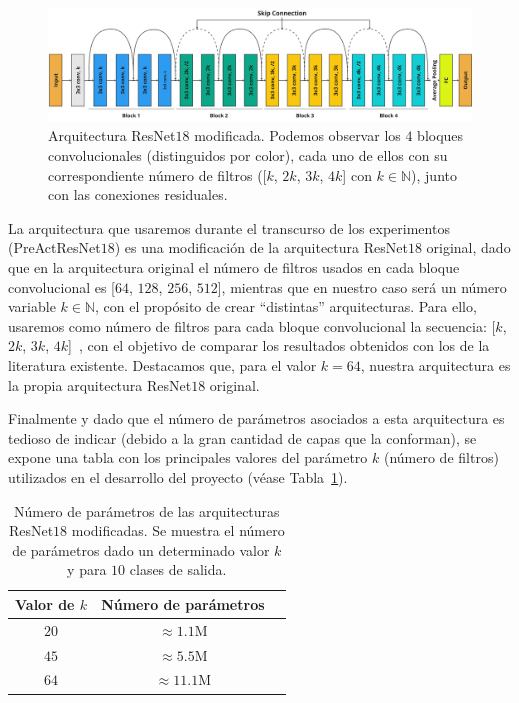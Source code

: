 \begin{figure}[h]
    \centering
    \includegraphics[width=\linewidth]{img/experiments/resnet18modified.png}
    \caption[Arquitectura ResNet$18$ modificada.]{Arquitectura ResNet$18$ modificada. Podemos observar los $4$ bloques convolucionales (distinguidos por color), cada uno de ellos con su correspondiente número de filtros ([$k$, $2k$, $3k$, $4k$] con $k \in \mathbb{N}$), junto con las conexiones residuales.}\label{fig:resnet18}
\end{figure}

La arquitectura que usaremos durante el transcurso de los experimentos (PreActResNet$18$) es una modificación de la arquitectura ResNet$18$ original, dado que en la arquitectura original el número de filtros usados en cada bloque convolucional es [$64$, $128$, $256$, $512$], mientras que en nuestro caso será un número variable $k \in \mathbb{N}$, con el propósito de crear ``distintas'' arquitecturas. Para ello, usaremos como número de filtros para cada bloque convolucional la secuencia: [$k$, $2k$, $3k$, $4k$]~\cite{Nakkiran2019}, con el objetivo de comparar los resultados obtenidos con los de la literatura existente. Destacamos que, para el valor $k=64$, nuestra arquitectura es la propia arquitectura ResNet$18$ original.

Finalmente y dado que el número de parámetros asociados a esta arquitectura es tedioso de indicar (debido a la gran cantidad de capas que la conforman), se expone una tabla con los principales valores del parámetro $k$ (número de filtros) utilizados en el desarrollo del proyecto (véase Tabla~\ref{tab:numero-parametrosresnet}).

\begin{table}[ht]
    \centering
    \begin{tabular}{|c|c|c|}
    \hline
    \textbf{Valor de $k$}           & \textbf{Número de parámetros}                     
    \\ \hline
    $20$                  & $\approx 1.1$\space M                                            \\ \hline
    $45$                  & $\approx 5.5$\space M                                             \\ \hline
    $64$                  & $\approx 11.1$\space M                                             \\ \hline
    \end{tabular}
    \caption[Número de parámetros de las arquitecturas ResNet$18$ modificadas.]{Número de parámetros de las arquitecturas ResNet$18$ modificadas. Se muestra el número de parámetros dado un determinado valor $k$ y para $10$ clases de salida.}\label{tab:numero-parametrosresnet}
\end{table}

